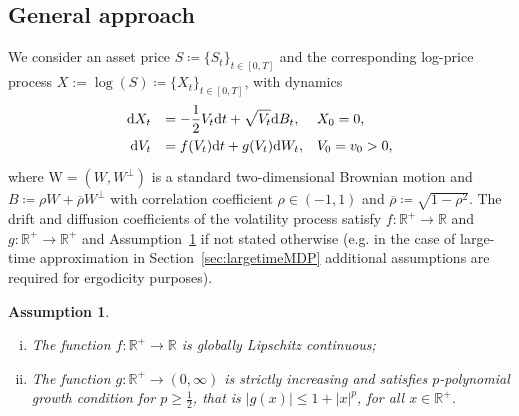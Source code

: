 \documentclass{amsart}[11pt]
\numberwithin{equation}{section}
\numberwithin{theorem}{subsection}
\numberwithin{proposition}{subsection}
\numberwithin{definition}{subsection}
\numberwithin{lemma}{subsection}
\newtheorem*{remark}{Remark}
\newtheorem{assumption}{Assumption}
\numberwithin{assumption}{subsection}
\newcommand{\RR}{\mathbb{R}}
\newcommand{\NN}{\mathbb{N}}
\newcommand{\Wf}{\boldsymbol{\mathrm{W}}}
\newcommand{\rrho}{\overline{\rho}}
\newcommand{\Wp}{W^{\perp}}
\newcommand{\D}{\mathrm{d}}
\newcommand\red[1]{\textcolor{red}{#1}}
\newcommand\blue[1]{\textcolor{blue}{#1}}
\begin{document}


\subsection{General approach}
We consider an asset price $S\coloneqq \{S_t\}_{t\in[0,T]}$ and the corresponding log-price process $X:=\log(S) \coloneqq \{X_t\}_{t\in[0,T]}$, with dynamics
\begin{equation}\label{eq:log_price_dyn}
\begin{array}{rll}
\def\arraystretch{1.5}
\D X_t & = \displaystyle -\frac{1}{2}V_t \D t + \sqrt{V_t} \D B_t, & X_0 = 0, \\
\D V_t & = f(V_t)\D t + g(V_t)\D W_t, & V_0 = v_0>0,
\end{array}
\end{equation}
where $\Wf = (W,\Wp)$ is a standard two-dimensional Brownian motion and $B\coloneqq \rho W + \rrho\Wp$ with correlation coefficient $\rho \in (-1,1)$ and $\rrho\coloneqq \sqrt{1-\rho^2}$. 
The drift and diffusion coefficients of the volatility process satisfy  $f:\RR^+\rightarrow\RR$ and $g:\RR^+\rightarrow\RR^+$ and Assumption~\ref{ass:SDE_coeffs} if not stated otherwise (e.g. in the case of large-time approximation in Section~\ref{sec:largetimeMDP} additional assumptions are required for ergodicity purposes). 
\begin{assumption}\label{ass:SDE_coeffs}\
\begin{enumerate}[i)]
\item The function $f:\RR^+\rightarrow\RR$ is globally Lipschitz continuous;
\item The function $g:\RR^+\rightarrow (0,\infty)$ is strictly increasing 
and satisfies $p$-polynomial growth condition for $p\geq\frac{1}{2}$, that is 
$|g(x)|\leq 1 + |x|^p$,
for all $x\in\RR^+$.
\end{enumerate}
\end{assumption}
\end{document}
